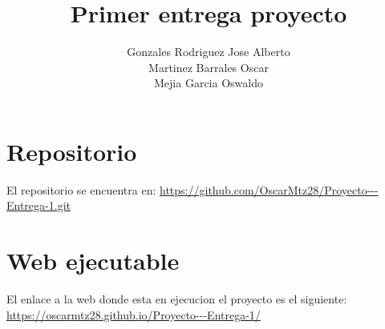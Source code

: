 \documentclass{article}
\begin{document}
\author{Gonzales Rodriguez Jose Alberto \\ Martinez Barrales Oscar \\ Mejia Garcia Oswaldo}

\title{Primer entrega proyecto}
\maketitle

\section*{Repositorio}

El repositorio se encuentra en: \url{https://github.com/OscarMtz28/Proyecto---Entrega-1.git}

\section*{Web ejecutable}

El enlace a la web donde esta en ejecucion el proyecto es el siguiente: \url{https://oscarmtz28.github.io/Proyecto---Entrega-1/}
\end{document}
